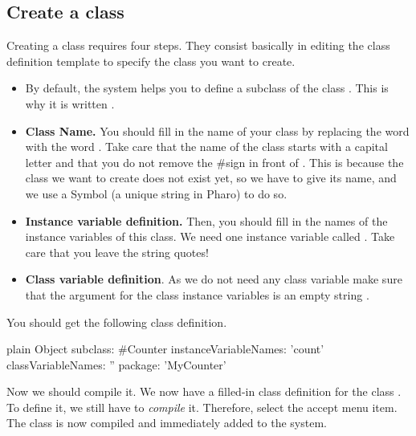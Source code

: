 \documentclass[10pt,twoside,english]{_support/latex/sbabook/sbabook}
\begin{document}
\subsection{Create a class}
Creating a class requires four steps. They consist basically in editing the class definition template to specify the class you want to create.

\begin{itemize}
\item By default, the system helps you to define a subclass of the class . This is why it is written .
\end{itemize}

\begin{itemize}
\item \textbf{Class Name.} You should fill in the name of your class by replacing the word  with the word . Take care that the name of the class starts with a capital letter and that you do not remove the \#sign in front of . This is because the class we want to create does not exist yet, so we have to give its name, and we use a Symbol (a unique string in Pharo) to do so. 
\end{itemize}

\begin{itemize}
\item \textbf{Instance variable definition.} Then, you should fill in the names of the instance variables of this class. We need one instance variable called . Take care that you leave the string quotes!
\end{itemize}

\begin{itemize}
\item \textbf{Class variable definition}. As we do not need any class variable make sure that the argument  for the class instance variables is an empty string .
\end{itemize}

You should get the following class definition.

\begin{displaycode}{plain}
Object subclass: #Counter
   instanceVariableNames: 'count'
   classVariableNames: ''
   package: 'MyCounter'
\end{displaycode}

Now we should compile it. We now have a filled-in class definition for the class . To define it, we still have to \textit{compile} it. Therefore, select the accept menu item. The class  is now compiled and immediately added to the system.
\end{document}
